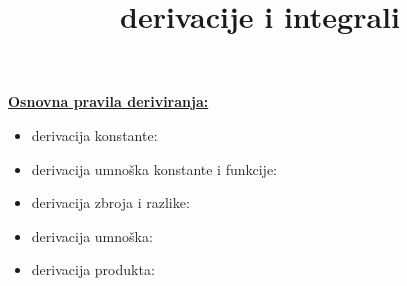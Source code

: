 \documentclass[12pt,oneside,a4paper]{report}
\title{derivacije i integrali}
\begin{document}
\noindent

\begin{center}
\end{center}

\vspace{5mm}
\noindent
\underline{\textbf{Osnovna pravila deriviranja:}}\\
\begin{itemize}
\item derivacija konstante: 
\item derivacija umno\v{s}ka konstante i funkcije: 
\item derivacija zbroja i razlike: 
\item derivacija umno\v{s}ka: 
\hspace{5mm}
\item derivacija produkta: 
\end{itemize}
\end{document}
